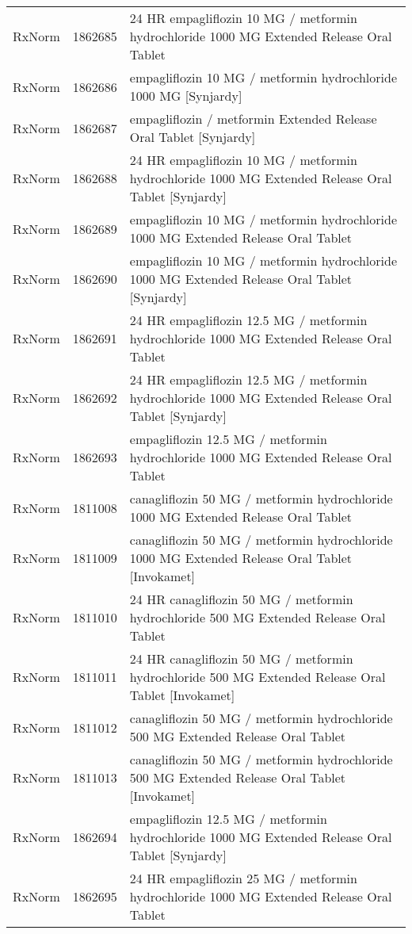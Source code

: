 \begin{longtable}{p{}p{}p{}}
  RxNorm & 1862685 & 24 HR empagliflozin 10 MG / metformin hydrochloride 1000 MG Extended Release Oral Tablet \\ 
  RxNorm & 1862686 & empagliflozin 10 MG / metformin hydrochloride 1000 MG [Synjardy] \\ 
  RxNorm & 1862687 & empagliflozin / metformin Extended Release Oral Tablet [Synjardy] \\ 
  RxNorm & 1862688 & 24 HR empagliflozin 10 MG / metformin hydrochloride 1000 MG Extended Release Oral Tablet [Synjardy] \\ 
  RxNorm & 1862689 & empagliflozin 10 MG / metformin hydrochloride 1000 MG Extended Release Oral Tablet \\ 
  RxNorm & 1862690 & empagliflozin 10 MG / metformin hydrochloride 1000 MG Extended Release Oral Tablet [Synjardy] \\ 
  RxNorm & 1862691 & 24 HR empagliflozin 12.5 MG / metformin hydrochloride 1000 MG Extended Release Oral Tablet \\ 
  RxNorm & 1862692 & 24 HR empagliflozin 12.5 MG / metformin hydrochloride 1000 MG Extended Release Oral Tablet [Synjardy] \\ 
  RxNorm & 1862693 & empagliflozin 12.5 MG / metformin hydrochloride 1000 MG Extended Release Oral Tablet \\ 
  RxNorm & 1811008 & canagliflozin 50 MG / metformin hydrochloride 1000 MG Extended Release Oral Tablet \\ 
  RxNorm & 1811009 & canagliflozin 50 MG / metformin hydrochloride 1000 MG Extended Release Oral Tablet [Invokamet] \\ 
  RxNorm & 1811010 & 24 HR canagliflozin 50 MG / metformin hydrochloride 500 MG Extended Release Oral Tablet \\ 
  RxNorm & 1811011 & 24 HR canagliflozin 50 MG / metformin hydrochloride 500 MG Extended Release Oral Tablet [Invokamet] \\ 
  RxNorm & 1811012 & canagliflozin 50 MG / metformin hydrochloride 500 MG Extended Release Oral Tablet \\ 
  RxNorm & 1811013 & canagliflozin 50 MG / metformin hydrochloride 500 MG Extended Release Oral Tablet [Invokamet] \\ 
  RxNorm & 1862694 & empagliflozin 12.5 MG / metformin hydrochloride 1000 MG Extended Release Oral Tablet [Synjardy] \\ 
  RxNorm & 1862695 & 24 HR empagliflozin 25 MG / metformin hydrochloride 1000 MG Extended Release Oral Tablet \\ 

\end{longtable}
